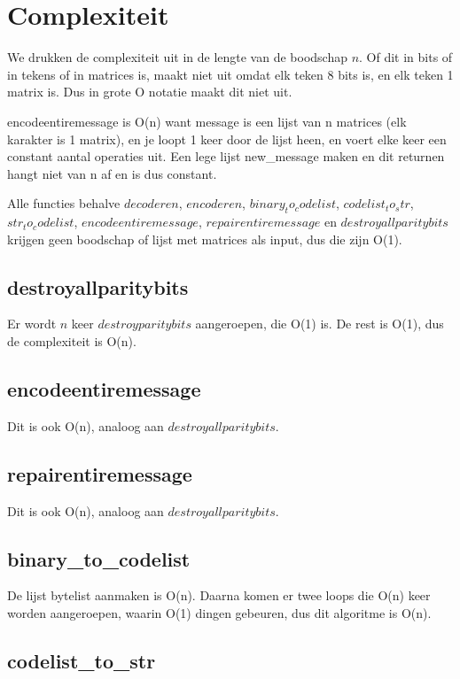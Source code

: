 \documentclass[a4paper]{article}
\begin{document}
\section{Complexiteit}
We drukken de complexiteit uit in de lengte van de boodschap \(n\). Of dit in bits of in tekens of in matrices is, maakt niet uit omdat elk teken 8 bits is, en elk teken 1 matrix is. Dus in grote O notatie maakt dit niet uit.

encodeentiremessage is O(n) want message is een lijst van n matrices (elk karakter is 1 matrix), en je loopt 1 keer door de lijst heen, en voert elke keer een constant aantal operaties uit. Een lege lijst new\_message maken en dit returnen hangt niet van n af en is dus constant.

Alle functies behalve $decoderen$, $encoderen$, $binary_to_codelist$, $codelist_to_str$, $str_to_codelist$, $encodeentiremessage$, $repairentiremessage$ en $destroyallparitybits$ krijgen geen boodschap of lijst met matrices als input, dus die zijn O(1). 

\subsection{destroyallparitybits}

Er wordt $n$ keer $destroyparitybits$ aangeroepen, die O(1) is. De rest is O(1), dus de complexiteit is O(n).

\subsection{encodeentiremessage}

Dit is ook O(n), analoog aan $destroyallparitybits$.

\subsection{repairentiremessage}

Dit is ook O(n), analoog aan $destroyallparitybits$.

\subsection{binary\_to\_codelist}

De lijst bytelist aanmaken is O(n). Daarna komen er twee loops die O(n) keer worden aangeroepen, waarin O(1) dingen gebeuren, dus dit algoritme is O(n).

\subsection{codelist\_to\_str}
\end{document}

